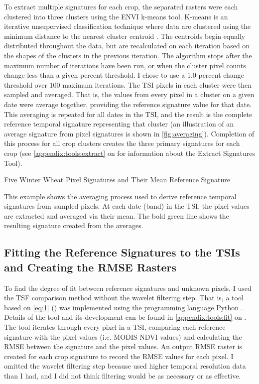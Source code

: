 To extract multiple signatures for each crop, the separated rasters were each clustered into three clusters using the ENVI \autocite{envi5.0} k-means tool. K-means is an iterative unsupervised classification technique where data are clustered using the minimum distance to the nearest cluster centroid \autocites{kmeans2014}{matteucciclustering:}. The centroids begin equally distributed throughout the data, but are recalculated on each iteration based on the shapes of the clusters in the previous iteration. The algorithm stops after the maximum number of iterations have been run, or when the cluster pixel counts change less than a given percent threshold. I chose to use a 1.0 percent change threshold over 100 maximum iterations. The TSI pixels in each cluster were then sampled and averaged. That is, the values from every pixel in a cluster on a given date were average together, providing the reference signature value for that date. This averaging is repeated for all dates in the TSI, and the result is the complete reference temporal signature representing that cluster (an illustration of an average signature from pixel signatures is shown in \autoref{fig:averaging}). Completion of this process for all crop clusters creates the three primary signatures for each crop (see \autoref{appendix:tools:extract} on  for information about the Extract Signatures Tool).

\begin{ssfigure}
  \centering
  
  \caption{Five Winter Wheat Pixel Signatures and Their Mean Reference Signature}
  \label{fig:averaging}
  \medskip
  \small
  This example shows the averaging process used to derive reference temporal signatures from sampled pixels. At each date (band) in the TSI, the pixel values are extracted and averaged via their mean. The bold green line shows the resulting signature created from the averages.
\end{ssfigure}


\subsection{Fitting the Reference Signatures to the TSIs and Creating the RMSE Rasters}

To find the degree of fit between reference signatures and unknown pixels, I used the TSF comparison method without the wavelet filtering step. That is, a tool based on \autoref{eq:1} () was implemented using the programming language Python \autocite{python2.7.8}. Details of the tool and its development can be found in \autoref{appendix:tools:fit} on . The tool iterates through every pixel in a TSI, comparing each reference signature with the pixel values (i.e. MODIS NDVI values) and calculating the RMSE between the signature and the pixel values. An output RMSE raster is created for each crop signature to record the RMSE values for each pixel. I omitted the wavelet filtering step because \citeauthor{sakamoto2010a-two-step} used higher temporal resolution data than I had, and I did not think filtering would be as necessary or as effective.

